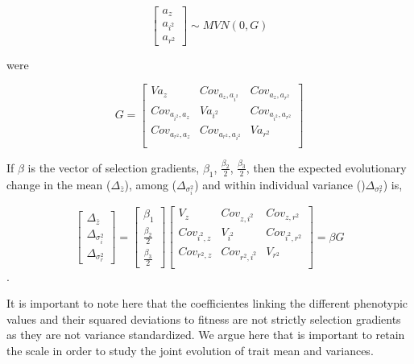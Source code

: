 \documentclass{article}
\begin{document}
\begin{equation} \label{eq:G1}
\begin{bmatrix}
	a_{z} \\
	a_{i^2} \\
	a_{r^2} 
\end{bmatrix}
\sim MVN(0,G)
\end{equation}

were 

\begin{equation} \label{eq:G2}
G=
\begin{bmatrix}
	Va_{z}        & Cov_{a_z, a_{i^2}}   & Cov_{a_z, a_{r^2}}\\
	Cov_{a_{i^2}, a_z} & Va_{i^2}        & Cov_{a_{i^2}, a_{r^2}} \\
	Cov_{a_{r^2}, a_z} & Cov_{a_{r^2}, a_{i^2}} & Va_{r^2} \\
\end{bmatrix}
\end{equation}

If $\beta$ is the vector of selection gradients, $\beta_1$, $\frac{\beta_2}{2}$, $\frac{\beta_3}{2}$, then the expected evolutionary change in the mean ($\Delta_{\bar{z}}$), among ($\Delta_{\sigma^2_{i}}$) and within individual variance ()$\Delta_{\sigma^2_{r}}$) is,

 \begin{equation} \label{eq:Deltas}
 \begin{bmatrix}
 \Delta_{\bar{z}} \\
  \Delta_{\sigma^2_{i}} \\
 \Delta_{\sigma^2_{r}}
 \end{bmatrix}
 = \begin{bmatrix}
 \beta_{1} \\
 \frac{\beta_2}{2} \\
 \frac{\beta_3}{2}
 \end{bmatrix}
 \begin{bmatrix}
 V_{z}        & Cov_{z, i^2}   & Cov_{z, r^2}\\
 Cov_{i^2, z} & V_{i^2}        & Cov_{i^2, r^2} \\
 Cov_{r^2, z} & Cov_{r^2, i^2} & V_{r^2} \\
 \end{bmatrix}
 =\beta G
 \end{equation}.
 
It is important to note here that the coefficientes linking the different phenotypic values and their squared deviations to fitness are not strictly selection gradients as they are not variance standardized. We argue here that is important to retain the scale in order to study the joint evolution of trait mean and variances. 
 
\end{document}
